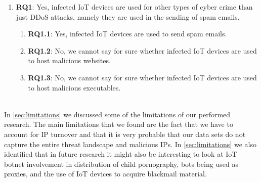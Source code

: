 \documentclass[a4paper,10pt]{article}
\begin{document}
\begin{enumerate}
    \item[] \textbf{RQ1}: Yes, infected IoT devices are used for other types of cyber crime than just DDoS attacks, namely
    they are used in the sending of spam emails.
    \begin{enumerate}
        \item[] \textbf{RQ1.1}: Yes,  infected IoT devices are used to send spam emails. 
        \item[] \textbf{RQ1.2}: No, we cannot say for sure whether infected IoT devices are used to host malicious websites.
        \item[] \textbf{RQ1.3}: No, we cannot say for sure whether infected IoT devices are used to host malicious executables.
    \end{enumerate}
\end{enumerate}
~\\
In \autoref{sec:limitations} we discussed some of the limitations of our performed research. The main limitations that we
found are the fact that we have to account for IP turnover and that it is very probable that our data sets do not capture the
entire threat landscape and malicious IPs. In \autoref{sec:limitations} we also identified that in future research it might also
be interesting to look at IoT botnet involvement in  distribution of child pornography, bots being used as proxies, and the 
use of IoT devices to acquire blackmail material.




\appendix
\end{document}

